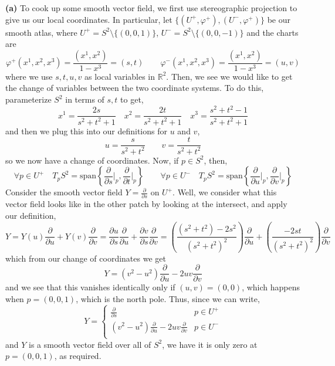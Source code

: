 \documentclass[10pt]{article}
\newcommand{\R}{\mathbb{R}}
\begin{document}
\textbf{(a)} To cook up some smooth vector field, we first use stereographic projection to give us our local coordinates. In particular, let $\{(U^{+},\varphi^{+}),(U^{-},\varphi^{+})\}$ be our smooth atlas, where $U^{+} = S^{2}\setminus \{(0,0,1)\}$, $U^{-} = S^{2}\setminus \{(0,0,-1)\}$ and the charts are
\[ \varphi^{+}(x^{1},x^{2},x^{3}) = \frac{(x^{1},x^{2})}{1-x^{3}} = (s,t) \hspace{2em} \varphi^{-}(x^{1},x^{2},x^{3}) = \frac{(x^{1},x^{2})}{1-x^{3}} = (u,v) \]
where we use $s,t,u,v$ as local variables in $\R^{2}$. Then, we see we would like to get the change of variables between the two coordinate systems. To do this, parameterize $S^{2}$ in terms of $s,t$ to get,
\[ x^{1} = \frac{2s}{s^{2}+t^{2}+1} \hspace{1em} x^{2} = \frac{2t}{s^{2}+t^{2}+1} \hspace{1em} x^{3} = \frac{s^{2}+t^{2}-1}{s^{2}+t^{2}+1} \]
and then we plug this into our definitions for $u$ and $v$,
\[ u = \frac{s}{s^{2}+t^{2}} \hspace{2em} v = \frac{t}{s^{2} + t^{2}} \]
so we now have a change of coordinates. Now, if $p\in S^{2}$, then,
\[ \forall p\in U^{+} \hspace{1em} T_{p}S^{2} = \text{span}\left\{\frac{\partial}{\partial s}\bigg\rvert_{p},\frac{\partial}{\partial t}\bigg\rvert_{p}\right\} \hspace{2em} \forall p\in U^{-} \hspace{1em} T_{p}S^{2} = \text{span}\left\{\frac{\partial}{\partial u}\bigg\rvert_{p},\frac{\partial}{\partial v}\bigg\rvert_{p}\right\}\]
Consider the smooth vector field $Y = \frac{\partial}{\partial s}$ on $U^{+}$. Well, we consider what this vector field looks like in the other patch by looking at the intersect, and apply our definition,
\[ Y = Y(u)\frac{\partial}{\partial u} + Y(v)\frac{\partial}{\partial v} = \frac{\partial u}{\partial s}\frac{\partial}{\partial u} + \frac{\partial v}{\partial s}\frac{\partial}{\partial v} = \left(\frac{(s^{2}+t^{2}) - 2s^{2}}{(s^{2}+t^{2})^{2}}\right)\frac{\partial}{\partial u} + \left(\frac{-2st}{(s^{2} + t^{2})^{2}}\right)\frac{\partial}{\partial v} \]
which from our change of coordinates we get
\[ Y = (v^{2} - u^{2})\frac{\partial}{\partial u} - 2uv\frac{\partial}{\partial v} \]
and we see that this vanishes identically only if $(u,v) = (0,0)$, which happens when $p = (0,0,1)$, which is the north pole. Thus, since we can write,
\[ Y = 
\begin{cases}
  \frac{\partial}{\partial s} & p\in U^{+} \\
  (v^{2} - u^{2})\frac{\partial}{\partial u} - 2uv\frac{\partial}{\partial v} & p\in U^{-} \\
\end{cases}
\]
and $Y$ is a smooth vector field over all of $S^{2}$, we have it is only zero at $p = (0,0,1)$, as required.
\end{document}

